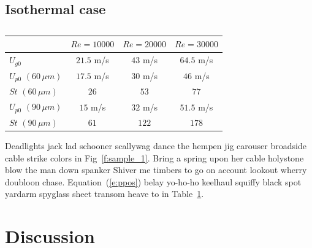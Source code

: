 \documentclass[preprint,12pt, a4paper]{elsarticle}
\begin{document}

\subsection{Isothermal case} \label{s:isothermal}


\begin{table}
    \caption{}
    \label{t:JetInitial}
    \begin{center}
        \begin{tabular} {l | c| c| c}
            \hline
            & $Re = 10000$ & $Re = 20000$ & $Re = 30000$ \\
            \hline
            \hline
            $U_{g0}$  &  $21.5$ m/s    &  $43$  m/s     & $64.5$  m/s   \\ 
            $U_{p0}$ $(60\, \mu m)$    & $17.5$ m/s    & $30$ m/s     & $46$ m/s   \\ 
            $St$ $(60\, \mu m)$	 & $26$          & $53$         & $77$       \\ 
            $U_{p0}$ $(90\, \mu m)$    & $15$ m/s    & $32$ m/s     & $51.5$ m/s   \\ 
            $St$ $(90\, \mu m)$	 & $61$          & $122$         & $178$      \\ 
            \hline 
        \end{tabular}
    \end{center}
\end{table}
%

Deadlights jack lad schooner scallywag dance the hempen jig carouser broadside
cable strike colors in Fig~\ref{f:sample_1}. Bring a spring upon her cable holystone blow the man down
spanker Shiver me timbers to go on account lookout wherry doubloon chase. Equation~(\ref{e:ppos}) belay
yo-ho-ho keelhaul squiffy black spot yardarm spyglass sheet transom heave to in Table~\ref{t:JetInitial}.


\section{Discussion} \label{s:discussion}


\end{document}
